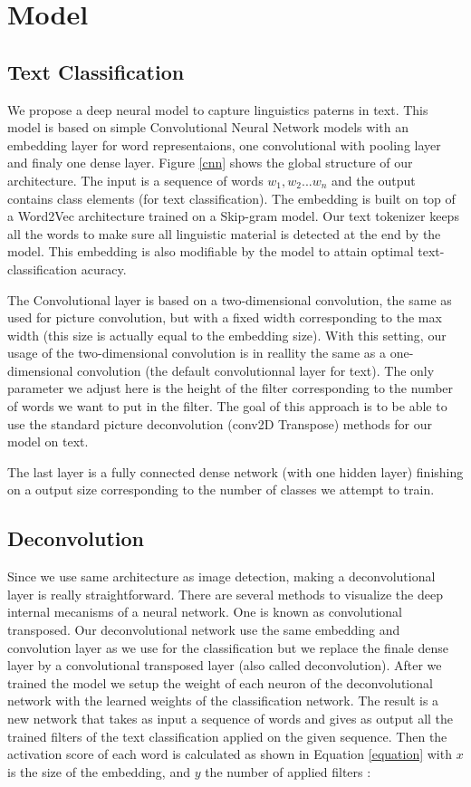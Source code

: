 \section{Model}

\subsection{Text Classification}

We propose a deep neural model to capture linguistics paterns in text. This model is based on simple Convolutional Neural Network models with an embedding layer for word representaions, one convolutional with pooling layer and finaly one dense layer. Figure \ref{cnn} shows the global structure of our architecture. The input is a sequence of words $ w_{1}, w_{2} ... w_{n} $ and the output contains class elements (for text classification). The embedding is built on top of a Word2Vec architecture trained on a Skip-gram model. Our text tokenizer keeps all the words to make sure all linguistic material is detected at the end by the model. This embedding is also modifiable by the model to attain optimal text-classification acuracy. 

The Convolutional layer is based on a two-dimensional convolution, the same as used for picture convolution, but with a fixed width corresponding to the max width (this size is actually equal to the embedding size). With this setting, our usage of the two-dimensional convolution is in reallity the same as a one-dimensional convolution (the default convolutionnal layer for text). The only parameter we adjust here is the height of the filter corresponding to the number of words we want to put in the filter. The goal of this approach is to be able to use the standard picture deconvolution (conv2D Transpose) methods for our model on text.

The last layer is a fully connected dense network (with one hidden layer) finishing on a output size corresponding to the number of classes we attempt to train.

\subsection{Deconvolution}

Since we use same architecture as image detection, making a deconvolutional layer is really straightforward. There are several methods to visualize the deep internal mecanisms of a neural network. One is known as convolutional transposed. Our deconvolutional network use the same embedding and convolution layer as we use for the classification but we replace the finale dense layer by a convolutional transposed layer (also called deconvolution). After we trained the model we setup the weight of each neuron of the deconvolutional network with the learned weights of the classification network. The result is a new network that takes as input a sequence of words and gives as output all the trained filters of the text classification applied on the given sequence. Then the activation score of each word is calculated as shown in Equation \ref{equation} with $x$ is the size of the embedding, and $y$ the number of applied filters : 

